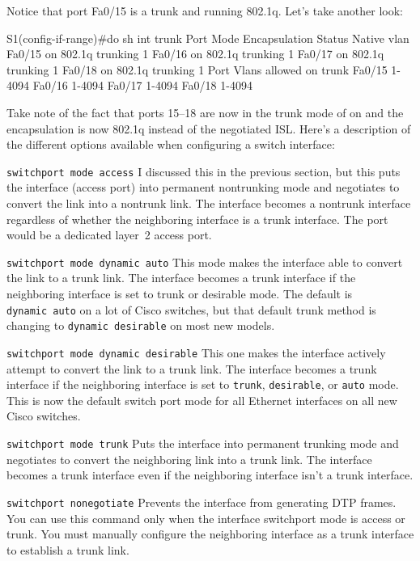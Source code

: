 Notice that port Fa0/15 is a trunk and running 802.1q.
Let's take another look:

\begin{cli}
S1(config-if-range)#do sh int trunk
Port        Mode             Encapsulation  Status        Native vlan
Fa0/15      on               802.1q         trunking      1
Fa0/16      on               802.1q         trunking      1
Fa0/17      on               802.1q         trunking      1
Fa0/18      on               802.1q         trunking      1
Port        Vlans allowed on trunk
Fa0/15      1-4094
Fa0/16      1-4094
Fa0/17      1-4094
Fa0/18      1-4094
\end{cli}

Take note of the fact that ports 15--18 are now in the trunk mode of on
and the encapsulation is now 802.1q instead of the negotiated ISL.
Here's a description of the different options available when configuring
a switch interface:

\texttt{switchport\ mode\ access} I discussed this in the previous
section, but this puts the interface (access port) into permanent
nontrunking mode and negotiates to convert the link into a nontrunk
link. The interface becomes a nontrunk interface regardless of whether
the neighboring interface is a trunk interface. The port would be a
dedicated layer~2 access port.

\texttt{switchport\ mode\ dynamic\ auto} This mode makes the interface
able to convert the link to a trunk link. The interface becomes a trunk
interface if the neighboring
interface is set to
trunk or desirable mode. The default is \texttt{dynamic\ auto} on a lot
of Cisco switches, but that default trunk method is changing to
\texttt{dynamic\ desirable} on most new models.

\texttt{switchport\ mode\ dynamic\ desirable} This one makes the
interface actively attempt to convert the link to a trunk link. The
interface becomes a trunk interface if the neighboring interface is set
to \texttt{trunk}, \texttt{desirable}, or \texttt{auto} mode. This is
now the default switch port mode for all Ethernet interfaces on all new
Cisco switches.

\texttt{switchport\ mode\ trunk} Puts the interface into permanent
trunking mode and negotiates to convert the neighboring link into a
trunk link. The interface becomes a trunk interface even if the
neighboring interface isn't a trunk interface.

\texttt{switchport\ nonegotiate} Prevents the interface from generating
DTP frames. You can use this command only when the interface switchport
mode is access or trunk. You must manually configure the neighboring
interface as a trunk interface to establish a trunk link.


